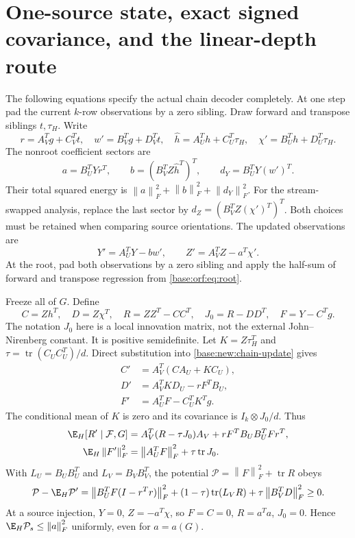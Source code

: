 \documentclass[11pt,oneside,openany,a4paper]{book}
\numberwithin{equation}{chapter}
\theoremstyle{definition}
\theoremstyle{remark}
\newcommand{\F}[1]{\left\lVert#1\right\rVert_F}
\DeclareMathOperator{\tr}{tr}\DeclareMathOperator{\rank}{rank}
\begin{document}
\section{One-source state, exact signed covariance, and the linear-depth route}\label{base:new:signed}
The following equations specify the actual chain decoder completely. At one step pad the current $k$-row observations by a zero sibling. Draw forward and transpose siblings $t,\tau_H$. Write
\[
 r=A_V^Tg+C_V^Tt,\quad w'=B_V^Tg+D_V^Tt,
 \quad \widehat h=A_U^Th+C_U^T\tau_H,\quad \chi'=B_U^Th+D_U^T\tau_H.
\]
The nonroot coefficient sectors are
\begin{equation}\label{base:new:readout}
 a=B_U^TYr^T,\qquad b=(B_V^TZ\widehat h^T)^T,\qquad d_Y=B_U^TY(w')^T.
\end{equation}
Their total squared energy is $\F a^2+\F b^2+\F{d_Y}^2$. For the stream-swapped analysis, replace the last sector by $d_Z=(B_V^TZ(\chi')^T)^T$. Both choices must be retained when comparing source orientations. The updated observations are
\begin{equation}\label{base:new:chain-update}
 Y'=A_U^TY-bw',\qquad Z'=A_V^TZ-a^T\chi'.
\end{equation}
At the root, pad both observations by a zero sibling and apply the half-sum of forward and transpose regression from \eqref{base:orf:eq:root}.

Freeze all of $G$. Define
\[
 C=Zh^T,\quad D=Z\chi^T,\quad R=ZZ^T-CC^T,
 \quad J_0=R-DD^T,\quad F=Y-C^Tg.
\]
The notation $J_0$ here is a local innovation matrix, not the external John--Nirenberg constant. It is positive semidefinite. Let $K=Z\tau_H^T$ and $\tau=\tr(C_UC_U^T)/d$. Direct substitution into \eqref{base:new:chain-update} gives
\begin{align}
 C'&=A_V^T(CA_U+KC_U),\label{base:new:C-update}\\
 D'&=A_V^TKD_U-rF^TB_U,\\
 F'&=A_U^TF-C_U^TK^Tg.\label{base:new:F-update}
\end{align}
The conditional mean of $K$ is zero and its covariance is $I_k\otimes J_0/d$. Thus
\begin{align}
 \E_H[R'\mid\mathcal F,G]&=A_V^T(R-\tau J_0)A_V+rF^TB_UB_U^TFr^T,\label{base:new:R-update}\\
 \E_H\F{F'}^2&=\F{A_U^TF}^2+\tau\tr J_0.\label{base:new:F-energy}
\end{align}
With $L_U=B_UB_U^T$ and $L_V=B_VB_V^T$, the potential $\mathcal P=\F F^2+\tr R$ obeys
\begin{equation}\label{base:new:P-drop}
 \mathcal P-\E_H\mathcal P'=\F{B_U^TF(I-r^Tr)}^2+
 (1-\tau)\tr(L_VR)+\tau\F{B_V^TD}^2\ge0.
\end{equation}
At a source injection, $Y=0$, $Z=-a^T\chi$, so $F=C=0$, $R=a^Ta$, $J_0=0$. Hence $\E_H\mathcal P_s\le\F a^2$ uniformly, even for $a=a(G)$.
\end{document}
